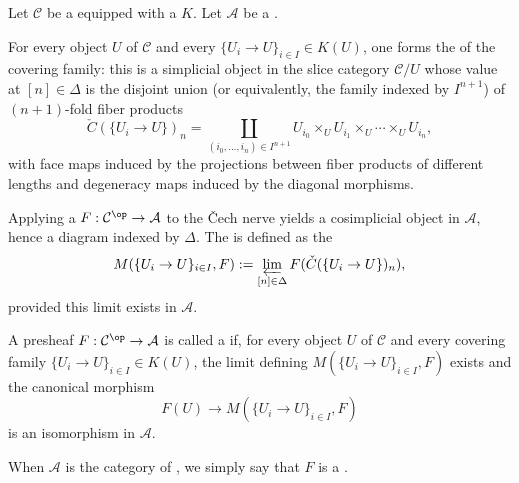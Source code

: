\begin{definition} \label{definition:sheaf_on_a_grothendieck_pretopology_valued_in_a_category}

    Let $\mathcal{C}$ be a  equipped with a  $K$.
    Let $\mathcal{A}$ be a .

    For every object $U$ of $\mathcal{C}$ and every  $\{U_i \to U\}_{i \in I} \in K(U)$, one forms the  of the covering family: this is a simplicial object in the slice category $\mathcal{C}/U$ whose value at $[n] \in \Delta$ is the disjoint union (or equivalently, the family indexed by $I^{n+1}$) of $(n+1)$-fold fiber products
    $$\check{C}(\{U_i \to U\})_n = \coprod_{(i_0,\ldots,i_n) \in I^{n+1}} U_{i_0} \times_U U_{i_1} \times_U \cdots \times_U U_{i_n},$$
    with face maps induced by the projections between fiber products of different lengths and degeneracy maps induced by the diagonal morphisms.

    Applying a  $F: \mathcal{C}^{\op} \to \mathcal{A}$ to the \v{C}ech nerve yields a cosimplicial object in $\mathcal{A}$, hence a diagram indexed by $\Delta$. The  is defined as the 
    $$M(\{U_i \to U\}_{i \in I}, F) := \varprojlim_{[n] \in \Delta} F(\check{C}(\{U_i \to U\})_n),$$
    provided this limit exists in $\mathcal{A}$.

    A presheaf $F: \mathcal{C}^{\op} \to \mathcal{A}$ is called a  if, for every object $U$ of $\mathcal{C}$ and every covering family $\{U_i \to U\}_{i \in I} \in K(U)$, the limit defining $M(\{U_i \to U\}_{i \in I}, F)$ exists and the canonical morphism
    $$F(U) \longrightarrow M(\{U_i \to U\}_{i \in I}, F)$$
    is an isomorphism in $\mathcal{A}$.

    When $\mathcal{A}$ is the category of , we simply say that $F$ is a .
\end{definition}
